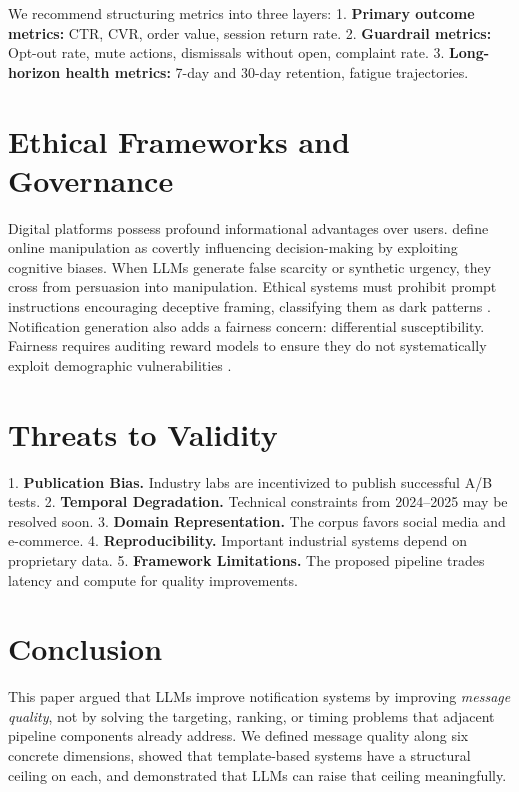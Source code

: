 \documentclass[11pt]{article}
\begin{document}
We recommend structuring metrics into three layers:
1. \textbf{Primary outcome metrics:} CTR, CVR, order value, session return rate.
2. \textbf{Guardrail metrics:} Opt-out rate, mute actions, dismissals without open, complaint rate.
3. \textbf{Long-horizon health metrics:} 7-day and 30-day retention, fatigue trajectories.

\section{Ethical Frameworks and Governance}

Digital platforms possess profound informational advantages over users. \citet{susser2019technology} define online manipulation as covertly influencing decision-making by exploiting cognitive biases. When LLMs generate false scarcity or synthetic urgency, they cross from persuasion into manipulation. Ethical systems must prohibit prompt instructions encouraging deceptive framing, classifying them as dark patterns \citep{mathur2021what}. Notification generation also adds a fairness concern: differential susceptibility. Fairness requires auditing reward models to ensure they do not systematically exploit demographic vulnerabilities \citep{wang2023survey}.

\section{Threats to Validity}

1. \textbf{Publication Bias.} Industry labs are incentivized to publish successful A/B tests.
2. \textbf{Temporal Degradation.} Technical constraints from 2024--2025 may be resolved soon.
3. \textbf{Domain Representation.} The corpus favors social media and e-commerce.
4. \textbf{Reproducibility.} Important industrial systems depend on proprietary data.
5. \textbf{Framework Limitations.} The proposed pipeline trades latency and compute for quality improvements.

\section{Conclusion}

This paper argued that LLMs improve notification systems by improving \textit{message quality}, not by solving the targeting, ranking, or timing problems that adjacent pipeline components already address. We defined message quality along six concrete dimensions, showed that template-based systems have a structural ceiling on each, and demonstrated that LLMs can raise that ceiling meaningfully.
\end{document}
